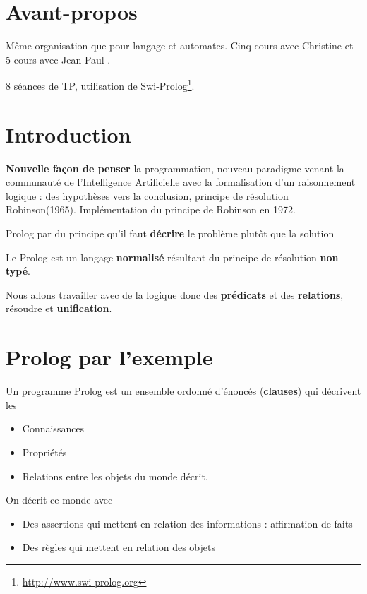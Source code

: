 \documentclass[12pt,a4paper,openany]{book}
\begin{document}
	\thispagestyle{empty} %
	\titleBC 
	\dominitoc
	\setcounter{tocdepth}{1}
	\setcounter{secnumdepth}{3}
	\setcounter{minitocdepth}{1}
	\chapter*{Avant-propos}
	Même organisation que pour langage et automates. Cinq cours avec Christine  et 5 cours avec Jean-Paul .

	8 séances de TP, utilisation de Swi-Prolog\footnote{\url{http://www.swi-prolog.org}}.
	\tableofcontents
	\chapter{Introduction}
	\textbf{Nouvelle façon de penser} la programmation, nouveau paradigme venant la communauté de l'Intelligence Artificielle avec la formalisation d'un
	raisonnement logique : des hypothèses vers la conclusion, principe de résolution Robinson(1965). Implémentation du principe de Robinson en 1972.

	Prolog par du principe qu'il faut \textbf{décrire} le problème plutôt que la solution

	Le Prolog est un langage \textbf{normalisé} résultant du principe de résolution \textbf{non typé}.

	Nous allons travailler avec de la logique donc des \textbf{prédicats} et des \textbf{relations}, résoudre et \textbf{unification}.

	\chapter{Prolog par l'exemple}
	Un programme Prolog est un ensemble ordonné d'énoncés (\textbf{clauses}) qui décrivent les 
	\begin{itemize}
		\item Connaissances
		\item Propriétés
		\item Relations entre les objets du monde décrit.
	\end{itemize}

	On décrit ce monde avec 
	\begin{itemize}
		\item Des assertions qui mettent en relation des informations : affirmation de faits
		\item Des règles qui mettent en relation des objets
	\end{itemize}
\end{document}
